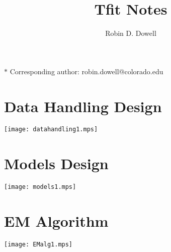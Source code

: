 \documentclass[11pt]{article}
\title{Tfit Notes}
\author{Robin D. Dowell}
\date{}
\date{ }
\begin{document}
\maketitle
\noindent $*$ Corresponding author: robin.dowell@colorado.edu

\section{Data Handling Design}
\texttt{[image: datahandling1.mps]}
\clearpage
\section{Models Design}
\texttt{[image: models1.mps]}
\clearpage
\section{EM Algorithm}
\texttt{[image: EMalg1.mps]}

\clearpage

\small{
  
  {}
}
\end{document}
